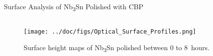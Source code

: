 \documentclass{beamer}
\begin{document}
\begin{frame}{}
\begin{columns}[t]
            \begin{column}{0.32\linewidth}    
                \begin{block}{\label{sec:samplestudy}Surface Analysis of Nb\textsubscript{3}Sn Polished with CBP}
                    \begin{columns}[t]
                        \begin{column}{0.4\columnwidth}
                            \begin{figure}[t]
                                \centering
                                \texttt{[image: ../doc/figs/Optical\_Surface\_Profiles.png]}
                                \caption{\label{fig:opticalsurfaceprofiles}Surface height maps of Nb\textsubscript{3}Sn polished between 0 to 8~hours.}
                            \end{figure}


\end{column}
\end{columns}
\end{block}
\end{column}
\end{columns}
\end{frame}
\end{document}
